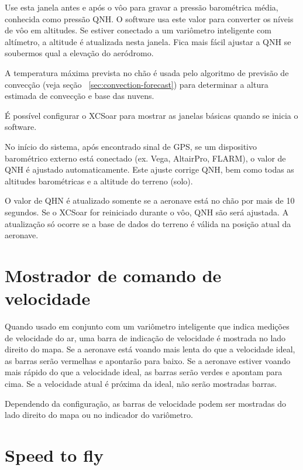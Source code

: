 Use esta janela antes e após o vôo para gravar a pressão barométrica média, conhecida como pressão QNH.  O software usa este valor para converter os níveis de vôo em altitudes.  Se estiver conectado a um variômetro inteligente com altímetro, a altitude é atualizada nesta janela.  Fica mais fácil ajustar a QNH se soubermos qual a elevação do aeródromo.

A temperatura máxima prevista no chão é usada pelo algoritmo de previsão de convecção (veja seção ~\ref{sec:convection-forecast}) para determinar a altura estimada de convecção e base das nuvens.

\tip É possível configurar o XCSoar para mostrar as janelas básicas quando se inicia o software.

No início do sistema, após encontrado sinal de GPS, se um dispositivo barométrico externo está conectado (ex. Vega, AltairPro, FLARM), o valor de QNH é ajustado automaticamente.  Este ajuste corrige QNH, bem como todas as altitudes barométricas e a altitude do terreno (solo).

O valor de QHN é atualizado somente se a aeronave está no chão por mais de 10 segundos.  Se o XCSoar for reiniciado durante o vôo, QNH são será ajustada.   A atualização só ocorre se a base de dados do terreno é válida na posição atual da aeronave.

\section{Mostrador de comando de velocidade}

Quando usado em conjunto com um variômetro inteligente que indica medições de velocidade do ar, uma barra de indicação de velocidade é mostrada no lado direito do mapa.  Se a aeronave está voando mais lenta do que a velocidade ideal, as barras serão vermelhas e apontarão para baixo.  Se a aeronave estiver voando mais rápido do que a velocidade ideal, as barras serão verdes e apontam para cima.  Se a velocidade atual é próxima da ideal, não serão mostradas barras.


Dependendo da configuração, as barras de velocidade podem ser mostradas do lado direito do mapa ou no indicador do variômetro. 

\section{Speed to fly}\label{sec:stf}

